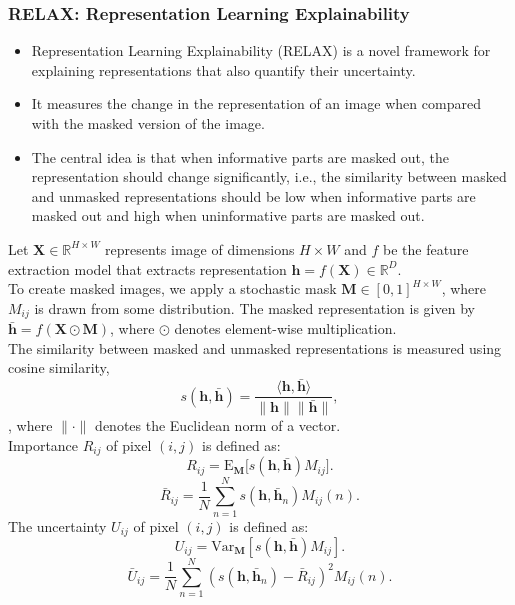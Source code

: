 \subsubsection{RELAX: Representation Learning Explainability}
\begin{itemize}
    \item Representation Learning Explainability (RELAX)\cite{wickstrøm2022relaxrepresentationlearningexplainability} is a novel framework for explaining representations that also quantify their uncertainty.
    \item It measures the change in the representation of an image when compared with the masked version of the image.
    \item The central idea is that when informative parts are masked out, the representation should change significantly, i.e., the similarity between masked and unmasked representations should be low when informative parts are masked out and high when uninformative parts are masked out.
\end{itemize} 
Let $\mathbf{X}\in \mathbb{R}^{H\times W}$ represents image of dimensions $H\times W$ and $f$ be the feature extraction model that extracts representation $\mathbf{h} = f(\mathbf{X}) \in \mathbb{R}^D$. \\
To create masked images, we apply a stochastic mask $\mathbf{M}\in [0, 1]^{H\times W}$, where $M_{ij}$ is drawn from some distribution.
The masked representation is given by $\bar{\mathbf{h}} = f(\mathbf{X}\odot \mathbf{M})$, where $\odot$ denotes element-wise multiplication.\\
The similarity between masked and unmasked representations is measured using cosine similarity, 
\begin{equation*}\label{eq:sim}
    s(\mathbf{h}, \bar{\mathbf{h}}) = \frac{\langle \mathbf{h}, \bar{\mathbf{h}}\rangle }{\lVert\mathbf{h}\rVert \lVert\bar{\mathbf{h}}\rVert},
\end{equation*}, where $\lVert\cdot\rVert$ denotes the Euclidean norm of a vector. \\
Importance $R_{ij}$ of pixel $(i,j)$ is defined as:
\begin{equation*}\label{eq:rel1}
    R_{ij} = \mathrm{E}_{\mathbf{M}}\big[s(\mathbf{h}, \bar{\mathbf{h}})M_{ij}\big].
\end{equation*}
\begin{equation*}\label{eq:rel2}
    \bar{R}_{ij} = \frac{1}{N}\sum\limits_{n=1}^N s(\mathbf{h}, \bar{\mathbf{h}}_n)M_{ij}(n).
\end{equation*}
The uncertainty $U_{ij}$ of pixel $(i,j)$ is defined as:
\begin{equation*}\label{eq:unc1}
    U_{ij} = \mathrm{Var}_{\mathbf{M}} [s(\mathbf{h}, \bar{\mathbf{h}})M_{ij}].
\end{equation*}
\begin{equation*}\label{eq:unc2}
    \bar{U}_{ij} = \frac{1}{N}\sum\limits_{n=1}^N (s(\mathbf{h}, \bar{\mathbf{h}}_n) - \bar{R}_{ij})^2 M_{ij}(n).
\end{equation*}

